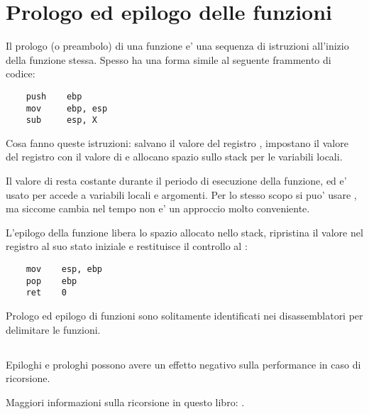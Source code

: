 \section{Prologo ed epilogo delle funzioni}
\label{sec:prologepilog}

Il prologo (o preambolo) di una funzione e' una sequenza di istruzioni all'inizio della funzione stessa.
Spesso ha una forma simile al seguente frammento di codice:

\begin{lstlisting}
    push    ebp
    mov     ebp, esp
    sub     esp, X
\end{lstlisting}

Cosa fanno queste istruzioni: salvano il valore del registro \EBP,
impostano il valore del registro \EBP con il valore di \ESP e allocano spazio sullo stack per le variabili locali.

Il valore di \EBP resta costante durante il periodo di esecuzione della funzione, ed e' usato per accede a variabili locali e argomenti.
Per lo stesso scopo si puo' usare \ESP, ma siccome cambia nel tempo non e' un approccio molto conveniente.

L'epilogo della funzione libera lo spazio allocato nello stack, ripristina il valore nel registro \EBP al suo stato iniziale e restituisce
il controllo al :

\begin{lstlisting}
    mov    esp, ebp
    pop    ebp
    ret    0
\end{lstlisting}

Prologo ed epilogo di funzioni sono solitamente identificati nei disassemblatori per delimitare le funzioni.

\subsection{\Recursion}

\myindex{\Recursion}
Epiloghi e prologhi possono avere un effetto negativo sulla performance in caso di ricorsione.

Maggiori informazioni sulla ricorsione in questo libro: .
